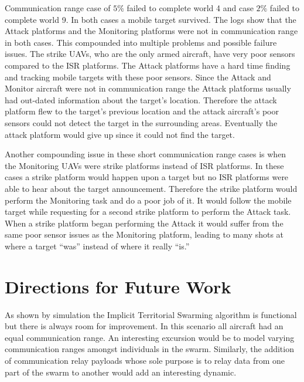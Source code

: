 \begin{multicols*}{2}
Communication range case of $5\%$ failed to complete world 4 and case $2\%$ failed to complete world 9.  In both cases a mobile target survived.  The logs show that the Attack platforms and the Monitoring platforms were not in communication range in both cases.  This compounded into multiple problems and possible failure issues.  The strike UAVs, who are the only armed aircraft, have very poor sensors compared to the ISR platforms.  The Attack platforms have a hard time finding and tracking mobile targets with these poor sensors.  Since the Attack and Monitor aircraft were not in communication range the Attack platforms usually had out-dated information about the target's location.  Therefore the attack platform flew to the target's previous location and the attack aircraft's poor sensors could not detect the target in the surrounding areas.  Eventually the attack platform would give up since it could not find the target.

Another compounding issue in these short communication range cases is when the Monitoring UAVs were strike platforms instead of ISR platforms.  In these cases a strike platform would happen upon a target but no ISR platforms were able to hear about the target announcement.  Therefore the strike platform would perform the Monitoring task and do a poor job of it.  It would follow the mobile target while requesting for a second strike platform to perform the Attack task.  When a strike platform began performing the Attack it would suffer from the same poor sensor issues as the Monitoring platform, leading to many shots at where a target ``was'' instead of where it really ``is.''


\section{Directions for Future Work}
As shown by simulation the Implicit Territorial Swarming algorithm is functional but there is always room for improvement.  In this scenario all aircraft had an equal communication range.  An interesting excursion would be to model varying communication ranges amongst individuals in the swarm.  Similarly, the addition of communication relay payloads whose sole purpose is to relay data from one part of the swarm to another would add an interesting dynamic.


\end{multicols*}
